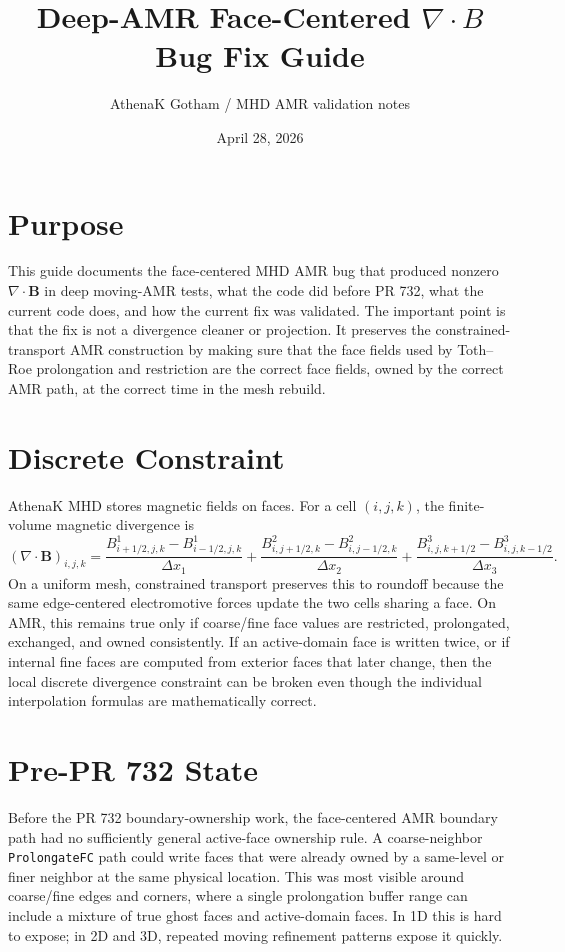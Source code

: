 \documentclass[11pt]{article}
\title{Deep-AMR Face-Centered \texorpdfstring{$\nabla\cdot B$}{divB} Bug Fix Guide}
\author{AthenaK Gotham / MHD AMR validation notes}
\date{April 28, 2026}
\newcommand{\code}[1]{\texttt{#1}}
\newcommand{\DivB}{\nabla\cdot\mathbf{B}}
\begin{document}
\maketitle

\section{Purpose}

This guide documents the face-centered MHD AMR bug that produced nonzero
\(\DivB\) in deep moving-AMR tests, what the code did before PR 732, what the
current code does, and how the current fix was validated.  The important point
is that the fix is not a divergence cleaner or projection.  It preserves the
constrained-transport AMR construction by making sure that the face fields used
by Toth--Roe prolongation and restriction are the correct face fields, owned by
the correct AMR path, at the correct time in the mesh rebuild.

\section{Discrete Constraint}

AthenaK MHD stores magnetic fields on faces.  For a cell \((i,j,k)\), the
finite-volume magnetic divergence is
\begin{equation}
  (\DivB)_{i,j,k} =
    \frac{B^1_{i+1/2,j,k} - B^1_{i-1/2,j,k}}{\Delta x_1}
  + \frac{B^2_{i,j+1/2,k} - B^2_{i,j-1/2,k}}{\Delta x_2}
  + \frac{B^3_{i,j,k+1/2} - B^3_{i,j,k-1/2}}{\Delta x_3}.
\end{equation}
On a uniform mesh, constrained transport preserves this to roundoff because the
same edge-centered electromotive forces update the two cells sharing a face.  On
AMR, this remains true only if coarse/fine face values are restricted,
prolongated, exchanged, and owned consistently.  If an active-domain face is
written twice, or if internal fine faces are computed from exterior faces that
later change, then the local discrete divergence constraint can be broken even
though the individual interpolation formulas are mathematically correct.

\section{Pre-PR 732 State}

Before the PR 732 boundary-ownership work, the face-centered AMR boundary path
had no sufficiently general active-face ownership rule.  A coarse-neighbor
\code{ProlongateFC} path could write faces that were already owned by a
same-level or finer neighbor at the same physical location.  This was most
visible around coarse/fine edges and corners, where a single prolongation buffer
range can include a mixture of true ghost faces and active-domain faces.  In 1D
this is hard to expose; in 2D and 3D, repeated moving refinement patterns expose
it quickly.
\end{document}
